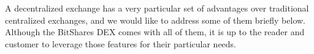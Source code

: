 A decentralized exchange has a very particular set of advantages over
traditional centralized exchanges, and we would like to address some of them
briefly below. Although the BitShares DEX comes with all of them, it is up to
the reader and customer to leverage those features for their particular needs.
